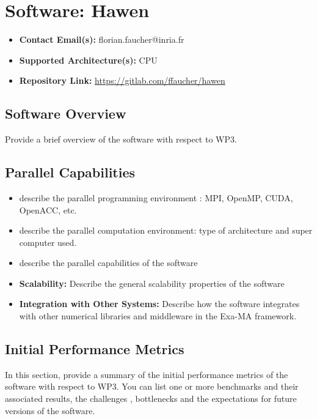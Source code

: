 \section{Software: Hawen}
\label{sec:WP3:Hawen:software}

\begin{itemize}
    \item \textbf{Contact Email(s):} florian.faucher@inria.fr
    \item \textbf{Supported Architecture(s):} CPU
    \item \textbf{Repository Link:} \href{https://gitlab.com/ffaucher/hawen}{https://gitlab.com/ffaucher/hawen}
\end{itemize}

\subsection{Software Overview}
\label{sec:WP3:Hawen:summary}

Provide a brief overview of the software with respect to WP3.

\subsection{Parallel Capabilities}
\label{sec:WP3:Hawen:performances}


\begin{itemize}
    \item describe the parallel programming  environment : MPI, OpenMP, CUDA, OpenACC, etc.
    \item describe the parallel computation environment: type of architecture and super computer used.
    \item describe the parallel capabilities of the software
    \item \textbf{Scalability:} Describe the general scalability properties of the software
    \item \textbf{Integration with Other Systems:} Describe how the software integrates with other numerical libraries and middleware in the Exa-MA framework.
\end{itemize}

\subsection{Initial Performance Metrics}
\label{sec:WP3:Hawen:metrics}

In this section, provide a summary of the initial performance metrics of the software with respect to WP3.
You can list one or more benchmarks and their associated results, the challenges , bottlenecks and the expectations for future versions of the software.




